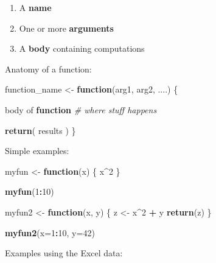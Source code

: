 \documentclass[
]{book}
\newenvironment{Shaded}{\begin{snugshade}}{\end{snugshade}}
\newcommand{\CommentTok}[1]{\textcolor[rgb]{0.56,0.35,0.01}{\textit{#1}}}
\newcommand{\ControlFlowTok}[1]{\textcolor[rgb]{0.13,0.29,0.53}{\textbf{#1}}}
\newcommand{\DataTypeTok}[1]{\textcolor[rgb]{0.13,0.29,0.53}{#1}}
\newcommand{\DecValTok}[1]{\textcolor[rgb]{0.00,0.00,0.81}{#1}}
\newcommand{\KeywordTok}[1]{\textcolor[rgb]{0.13,0.29,0.53}{\textbf{#1}}}
\newcommand{\NormalTok}[1]{#1}
\newcommand{\OperatorTok}[1]{\textcolor[rgb]{0.81,0.36,0.00}{\textbf{#1}}}
\newcommand{\StringTok}[1]{\textcolor[rgb]{0.31,0.60,0.02}{#1}}
\providecommand{\tightlist}{%
  \setlength{\itemsep}{0pt}\setlength{\parskip}{0pt}}
\begin{document}
\begin{enumerate}
\def\labelenumi{\arabic{enumi}.}
\tightlist
\item
  A \textbf{name}
\item
  One or more \textbf{arguments}
\item
  A \textbf{body} containing computations
\end{enumerate}

Anatomy of a function:

\begin{Shaded}
\begin{Highlighting}[]
\NormalTok{function_name <-}\StringTok{ }\ControlFlowTok{function}\NormalTok{(arg1, arg2, ....) \{}
  
\NormalTok{    body of }\ControlFlowTok{function} \CommentTok{# where stuff happens }

    \KeywordTok{return}\NormalTok{( results ) }
\NormalTok{\}}
\end{Highlighting}
\end{Shaded}

Simple examples:

\begin{Shaded}
\begin{Highlighting}[]
\NormalTok{myfun <-}\StringTok{ }\ControlFlowTok{function}\NormalTok{(x) \{}
\NormalTok{  x}\OperatorTok{^}\DecValTok{2}
\NormalTok{\}}

\KeywordTok{myfun}\NormalTok{(}\DecValTok{1}\OperatorTok{:}\DecValTok{10}\NormalTok{)}

\NormalTok{myfun2 <-}\StringTok{ }\ControlFlowTok{function}\NormalTok{(x, y) \{}
\NormalTok{  z <-}\StringTok{ }\NormalTok{x}\OperatorTok{^}\DecValTok{2} \OperatorTok{+}\StringTok{ }\NormalTok{y}
  \KeywordTok{return}\NormalTok{(z)}
\NormalTok{\}}

\KeywordTok{myfun2}\NormalTok{(}\DataTypeTok{x=}\DecValTok{1}\OperatorTok{:}\DecValTok{10}\NormalTok{, }\DataTypeTok{y=}\DecValTok{42}\NormalTok{)}
\end{Highlighting}
\end{Shaded}

Examples using the Excel data:

\begin{Shaded}
\end{Shaded}
\end{document}
